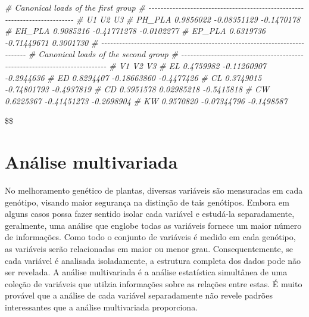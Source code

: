 \documentclass[
]{book}
\newenvironment{Shaded}{\begin{snugshade}}{\end{snugshade}}
\newcommand{\CommentTok}[1]{\textcolor[rgb]{0.56,0.35,0.01}{\textit{#1}}}
\numberwithin{equation}{section}
\begin{document}
\begin{Shaded}
\begin{Highlighting}[]
\CommentTok{\# Canonical loads of the first group }
\CommentTok{\# {-}{-}{-}{-}{-}{-}{-}{-}{-}{-}{-}{-}{-}{-}{-}{-}{-}{-}{-}{-}{-}{-}{-}{-}{-}{-}{-}{-}{-}{-}{-}{-}{-}{-}{-}{-}{-}{-}{-}{-}{-}{-}{-}{-}{-}{-}{-}{-}{-}{-}{-}{-}{-}{-}{-}{-}{-}{-}{-}{-}{-}{-}{-}{-}{-}{-}{-}{-}{-}{-}{-}{-}{-}{-}{-}}
\CommentTok{\#               U1          U2         U3}
\CommentTok{\# PH\_PLA 0.9856022 {-}0.08351129 {-}0.1470178}
\CommentTok{\# EH\_PLA 0.9085216 {-}0.41771278 {-}0.0102277}
\CommentTok{\# EP\_PLA 0.6319736 {-}0.71449671  0.3001730}
\CommentTok{\# {-}{-}{-}{-}{-}{-}{-}{-}{-}{-}{-}{-}{-}{-}{-}{-}{-}{-}{-}{-}{-}{-}{-}{-}{-}{-}{-}{-}{-}{-}{-}{-}{-}{-}{-}{-}{-}{-}{-}{-}{-}{-}{-}{-}{-}{-}{-}{-}{-}{-}{-}{-}{-}{-}{-}{-}{-}{-}{-}{-}{-}{-}{-}{-}{-}{-}{-}{-}{-}{-}{-}{-}{-}{-}{-}}
\CommentTok{\# Canonical loads of the second group }
\CommentTok{\# {-}{-}{-}{-}{-}{-}{-}{-}{-}{-}{-}{-}{-}{-}{-}{-}{-}{-}{-}{-}{-}{-}{-}{-}{-}{-}{-}{-}{-}{-}{-}{-}{-}{-}{-}{-}{-}{-}{-}{-}{-}{-}{-}{-}{-}{-}{-}{-}{-}{-}{-}{-}{-}{-}{-}{-}{-}{-}{-}{-}{-}{-}{-}{-}{-}{-}{-}{-}{-}{-}{-}{-}{-}{-}{-}}
\CommentTok{\#           V1          V2         V3}
\CommentTok{\# EL 0.4759982 {-}0.11260907 {-}0.2944636}
\CommentTok{\# ED 0.8294407 {-}0.18663860 {-}0.4477426}
\CommentTok{\# CL 0.3749015 {-}0.74801793 {-}0.4937819}
\CommentTok{\# CD 0.3951578  0.02985218 {-}0.5415818}
\CommentTok{\# CW 0.6225367 {-}0.41451273 {-}0.2698904}
\CommentTok{\# KW 0.9570820 {-}0.07344796 {-}0.1498587}
\end{Highlighting}
\end{Shaded}

\$\$

\hypertarget{multivariate}{%
\chapter{Análise multivariada}\label{multivariate}}

No melhoramento genético de plantas, diversas variáveis são mensuradas em cada genótipo, visando maior segurança na distinção de tais genótipos. Embora em alguns casos possa fazer sentido isolar cada variável e estudá-la separadamente, geralmente, uma análise que englobe todas as variáveis fornece um maior número de informações. Como todo o conjunto de variáveis é medido em cada genótipo, as variáveis serão relacionadas em maior ou menor grau. Consequentemente, se cada variável é analisada isoladamente, a estrutura completa dos dados pode não ser revelada. A análise multivariada é a análise estatística simultânea de uma coleção de variáveis que utilzia informações sobre as relações entre estas. É muito provável que a análise de cada variável separadamente não revele padrões interessantes que a análise multivariada proporciona.
\end{document}
